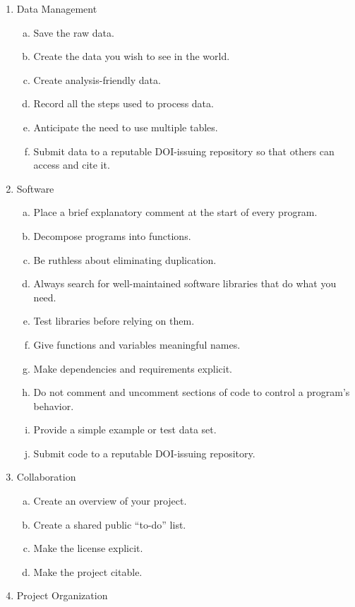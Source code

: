 \documentclass[10pt,letterpaper]{article}
\begin{document}
{\footnotesize
\begin{enumerate}
\item Data Management
  \begin{enumerate}[a)]
  \item Save the raw data.
  \item Create the data you wish to see in the world.
  \item Create analysis-friendly data.
  \item Record all the steps used to process data.
  \item Anticipate the need to use multiple tables.
  \item Submit data to a reputable DOI-issuing repository so that others can access and cite it.
  \end{enumerate}
\item Software
  \begin{enumerate}[a)]
  \item Place a brief explanatory comment at the start of every program.
  \item Decompose programs into functions.
  \item Be ruthless about eliminating duplication.
  \item Always search for well-maintained software libraries that do what you need.
  \item Test libraries before relying on them.
  \item Give functions and variables meaningful names.
  \item Make dependencies and requirements explicit.
  \item Do not comment and uncomment sections of code to control a program's behavior.
  \item Provide a simple example or test data set.
  \item Submit code to a reputable DOI-issuing repository.	
  \end{enumerate}
\item Collaboration
  \begin{enumerate}[a)]
  \item Create an overview of your project.
  \item Create a shared public ``to-do'' list.
  \item Make the license explicit.
  \item Make the project citable.
  \end{enumerate}
\item Project Organization
  \begin{enumerate}[a)]

\end{enumerate}
\end{enumerate}}
\end{document}
